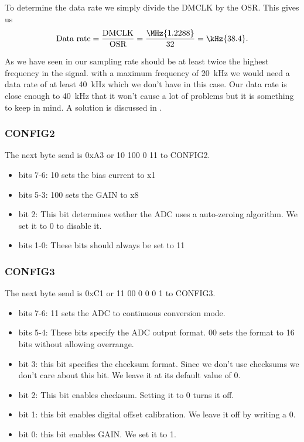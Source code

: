       To determine the data rate we simply divide the DMCLK by the OSR. This gives us
      \begin{equation}\label{eq: data rate}
        \text{Data rate} = \frac{\text{DMCLK}}{\text{OSR}} = \frac{\MHz{1.2288}}{32} = \kHz{38.4}.
      \end{equation}

      As we have seen in  our sampling rate should be at least twice the highest frequency in the signal. with a maximum frequency of 20~kHz we would need a data rate of at least 40~kHz which we don't have in this case. Our data rate is close enough to 40~kHz that it won't cause a lot of problems but it is something to keep in mind. A solution is discussed in .
  
    \subsubsection*{CONFIG2}\label{sss: CONFIG2}
      The next byte send is 0xA3 or 10 100 0 11 to CONFIG2.
      \begin{itemize}
        \item bits 7-6: 10 sets the bias current to x1
        \item bits 5-3: 100 sets the GAIN to x8
        \item bit 2: This bit determines wether the ADC uses a auto-zeroing algorithm. We set it to 0 to disable it.
        \item bits 1-0: These bits should always be set to 11
      \end{itemize}

    \subsubsection*{CONFIG3}\label{sss: CONFIG3}
      The next byte send is 0xC1 or 11 00 0 0 0 1 to CONFIG3.
      \begin{itemize}
        \item bits 7-6: 11 sets the ADC to continuous conversion mode.
        \item bits 5-4: These bits specify the ADC output format. 00 sets the format to 16 bits without allowing overrange.
        \item bit 3: this bit specifies the checksum format. Since we don't use checksums we don't care about this bit. We leave it at its default value  of 0.
        \item bit 2: This bit enables checksum. Setting it to 0 turns it off.
        \item bit 1: this bit enables digital offset calibration. We leave it off by writing a 0.
        \item bit 0: this bit enables GAIN. We set it to 1.
      \end{itemize}


